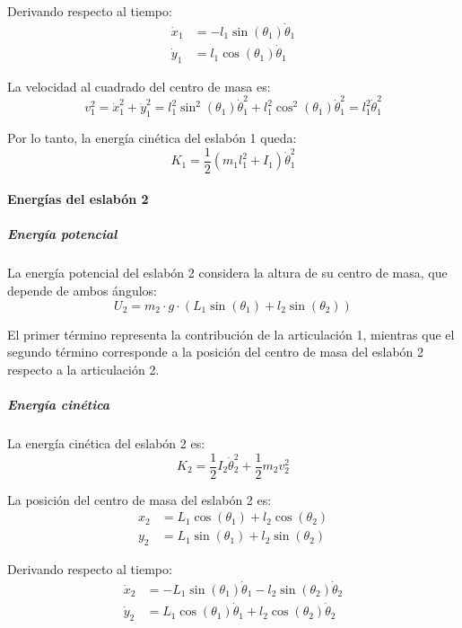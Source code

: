 Derivando respecto al tiempo:
\begin{align}
\dot{x}_1 &= -l_1 \sin(\theta_1) \dot{\theta}_1 \\
\dot{y}_1 &= l_1 \cos(\theta_1) \dot{\theta}_1
\end{align}

La velocidad al cuadrado del centro de masa es:
\begin{equation}
v_1^2 = \dot{x}_1^2 + \dot{y}_1^2 = l_1^2\sin^2(\theta_1)\dot{\theta}_1^2 + l_1^2\cos^2(\theta_1)\dot{\theta}_1^2 = l_1^2\dot{\theta}_1^2
\end{equation}

Por lo tanto, la energía cinética del eslabón 1 queda:
\begin{equation}
K_1 = \frac{1}{2}(m_1l_1^2 + I_1)\dot{\theta}_1^2
\end{equation}

\paragraph{Energías del eslabón 2}

\subparagraph{Energía potencial}

La energía potencial del eslabón 2 considera la altura de su centro de masa, que depende de ambos ángulos:
\begin{equation}
U_2 = m_2 \cdot g \cdot (L_1 \sin(\theta_1) + l_2 \sin(\theta_2))
\end{equation}

El primer término representa la contribución de la articulación 1, mientras que el segundo término corresponde a la posición del centro de masa del eslabón 2 respecto a la articulación 2.

\subparagraph{Energía cinética}

La energía cinética del eslabón 2 es:
\begin{equation}
K_2 = \frac{1}{2} I_2 \dot{\theta}_2^2 + \frac{1}{2} m_2 v_2^2
\end{equation}

La posición del centro de masa del eslabón 2 es:
\begin{align}
x_2 &= L_1\cos(\theta_1) + l_2\cos(\theta_2) \\
y_2 &= L_1\sin(\theta_1) + l_2\sin(\theta_2)
\end{align}

Derivando respecto al tiempo:
\begin{align}
\dot{x}_2 &= -L_1\sin(\theta_1)\dot{\theta}_1 - l_2\sin(\theta_2)\dot{\theta}_2 \\
\dot{y}_2 &= L_1\cos(\theta_1)\dot{\theta}_1 + l_2\cos(\theta_2)\dot{\theta}_2
\end{align}

